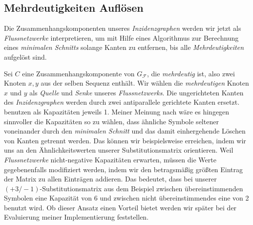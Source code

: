 \begin{center}
\end{center}

\subsection{Mehrdeutigkeiten Auflösen}

Die Zusammenhangskomponenten unseres \emph{Inzidenzgraphen} werden wir jetzt als \emph{Flussnetzwerke} interpretieren, um mit Hilfe eines Algorithmus zur Berechnung eines \emph{minimalen Schnitts} solange Kanten zu entfernen, bis alle \emph{Mehrdeutigkeiten} aufgelöst sind.

Sei $C$ eine Zusammenhangskomponente von $G_{\mathcal{F}}$, die \emph{mehrdeutig} ist, also zwei Knoten $x,y$ aus der selben Sequenz enthält. Wir wählen die \emph{mehrdeutigen} Knoten $x$ und $y$ als \emph{Quelle} und \emph{Senke} unseres \emph{Flussnetzwerks}. Die ungerichteten Kanten des \emph{Inzidenzgraphen} werden durch zwei antiparallele gerichtete Kanten ersetzt. \cite{cpm10} benutzen als Kapazitäten jeweils 1. Meiner Meinung nach wäre es hingegen sinnvoller die Kapazitäten so zu wählen, dass ähnliche Symbole seltener voneinander durch den \emph{minimalen Schnitt} und das damit einhergehende Löschen von Kanten getrennt werden. Das können wir beispielsweise erreichen, indem wir uns an den Ähnlichkeitswerten unserer Substitutionsmatrix orientieren. Weil \emph{Flussnetzwerke} nicht-negative Kapazitäten erwarten, müssen die Werte gegebenenfalls modifiziert werden, indem wir den betragsmäßig größten Eintrag der Matrix zu allen Einträgen addieren. Das bedeutet, dass bei unserer $(+3/-1)$-Substitutionsmatrix aus dem Beispiel zwischen übereinstimmenden Symbolen eine Kapazität von 6 und zwischen nicht übereinstimmendes eine von 2 benutzt wird. Ob dieser Ansatz einen Vorteil bietet werden wir später bei der Evaluierung meiner Implementierung feststellen.

